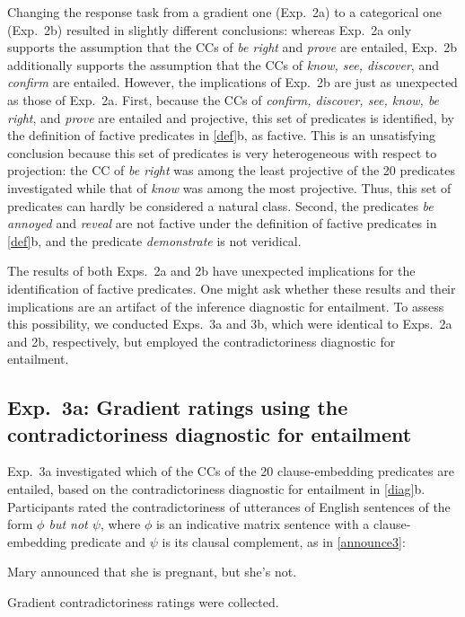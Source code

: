 \documentclass{language}
\newcommand{\6}{\mbox{$[\hspace*{-.6mm}[$}}
\newcommand{\9}{\mbox{$]\hspace*{-.6mm}]$}}
\begin{document}
Changing the response task from a gradient one (Exp.~2a) to a categorical one (Exp.~2b) resulted in slightly different conclusions: whereas Exp.~2a only supports the assumption that the CCs of {\em be right} and {\em prove} are entailed, Exp.~2b additionally supports the assumption that the CCs of {\em know, see, discover}, and {\em confirm} are entailed. However, the implications of Exp.~2b are just as unexpected as those of Exp.~2a. First, because the CCs of {\em confirm, discover, see, know, be right}, and {\em prove} are entailed and projective, this set of predicates is identified, by the definition of factive predicates in \ref{def}b, as factive. This is an unsatisfying conclusion because this set of predicates is very heterogeneous with respect to projection:  the CC of {\em be right} was among the least projective of the 20 predicates investigated while that of {\em know} was among the most projective. Thus, this set of predicates can hardly be considered a natural class. Second, the predicates {\em be annoyed} and {\em reveal} are  not factive under the definition of factive predicates in \ref{def}b, and the predicate {\em demonstrate} is  not veridical. 

The results of both Exps.~2a and 2b have unexpected implications for the identification of factive predicates. One might ask whether these results and their implications are an artifact of the inference diagnostic for entailment. To assess this possibility, we conducted Exps.~3a and 3b, which were identical to Exps.~2a and 2b, respectively, but employed the contradictoriness diagnostic for entailment.

\subsection{Exp.~3a: Gradient ratings using the contradictoriness diagnostic for entailment}\label{s32}

Exp.~3a investigated which of the CCs of the 20 clause-embedding predicates are entailed, based on the contradictoriness diagnostic for entailment in \ref{diag}b. Participants rated the contradictoriness of utterances of English sentences of the form {\em $\phi$ but not $\psi$}, where $\phi$ is an indicative matrix sentence with a clause-embedding predicate and $\psi$ is its clausal complement, as in \ref{announce3}:

\begin{exe}
\ex\label{announce3} Mary announced that she is pregnant, but she's not.
\end{exe}
Gradient contradictoriness ratings were collected.
\end{document}
